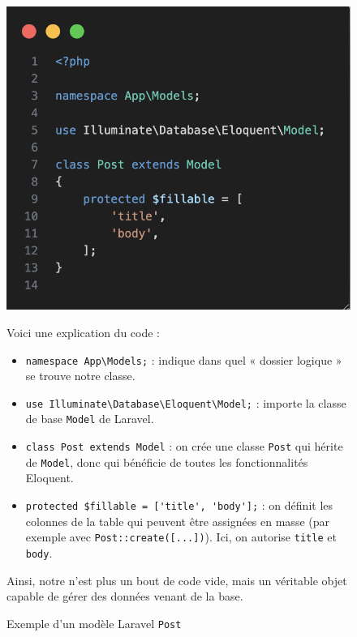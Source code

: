 \begin{figure}[H]
\centering
\begin{minipage}{0.4\linewidth}
  \includegraphics[width=\linewidth]{figures-C1/postmodel.png}
  \caption{Exemple d’un modèle Laravel \texttt{Post}}
\end{minipage}
\hfill
\begin{minipage}{0.55\linewidth}
Voici une explication du code :  
\begin{itemize}
  \item \verb|namespace App\Models;| : indique dans quel « dossier logique » se trouve notre classe.  
  \item \verb|use Illuminate\Database\Eloquent\Model;| : importe la classe de base \texttt{Model} de Laravel.  
  \item \verb|class Post extends Model| : on crée une classe \texttt{Post} qui hérite de \texttt{Model}, donc qui bénéficie de toutes les fonctionnalités Eloquent.  
  \item \verb|protected $fillable = ['title', 'body'];| : on définit les colonnes de la table qui peuvent être assignées en masse (par exemple avec \verb|Post::create([...])|). Ici, on autorise \texttt{title} et \texttt{body}.  
\end{itemize}
\end{minipage}
Ainsi, notre \model{} n'est plus un bout de code vide, mais un véritable objet capable de gérer des données venant de la base.
\end{figure}
